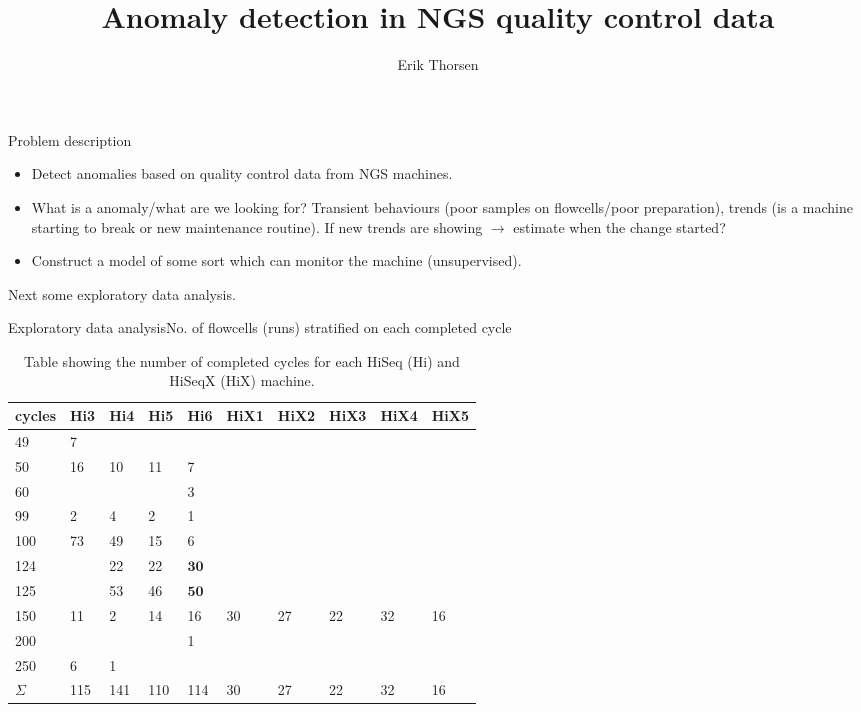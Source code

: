 \documentclass[11pt]{beamer}
\author{Erik Thorsen}
\title{Anomaly detection in NGS quality control data}
\begin{document}
\begin{frame}
\titlepage
\end{frame}


\begin{frame}{Problem description}
\begin{itemize}
\item Detect anomalies based on quality control data from NGS machines.
\item What is a anomaly/what are we looking for? Transient behaviours (poor samples on flowcells/poor preparation), trends (is a machine starting to break or new maintenance routine). If new trends are showing $\rightarrow$ estimate when the change started?
\item Construct a model of some sort which can monitor the machine (unsupervised).
\end{itemize}
Next some exploratory data analysis.
\end{frame}

\begin{frame}{Exploratory data analysis}{No. of flowcells (runs) stratified on each completed cycle}
\begin{table}[ht]
\centering
\begin{tabular}{llllllllll}
  \hline
cycles & Hi3 & Hi4 & Hi5 & Hi6 & HiX1 & HiX2 & HiX3 & HiX4 & HiX5 \\ 
  \hline
49 & 7 &  &  &  &  &  &  &  &  \\ 
  50 & 16 & 10 & 11 & 7 &  &  &  &  &  \\ 
  60 &  &  &  & 3 &  &  &  &  &  \\ 
  99 & 2 & 4 & 2 & 1 &  &  &  &  &  \\ 
  100 & 73 & 49 & 15 & 6 &  &  &  &  &  \\ 
  124 &  & 22 & 22 & $\mathbf{30}$ &  &  &  &  &  \\ 
  125 &  & 53 & 46 & $\mathbf{50}$ &  &  &  &  &  \\ 
  150 & 11 & 2 & 14 & 16 & 30 & 27 & 22 & 32 & 16 \\ 
  200 &  &  &  & 1 &  &  &  &  &  \\ 
  250 & 6 & 1 &  &  &  &  &  &  &  \\ 
  \hline
  $\Sigma$ & 115 & 141 & 110 & 114 & 30 & 27 & 22 & 32 & 16 \\ 
   \hline
\end{tabular}
\caption{Table showing the number of completed cycles for each HiSeq (Hi) and HiSeqX (HiX) machine.} 
\label{CompCycl}
\end{table}
\end{frame}
\end{document}

